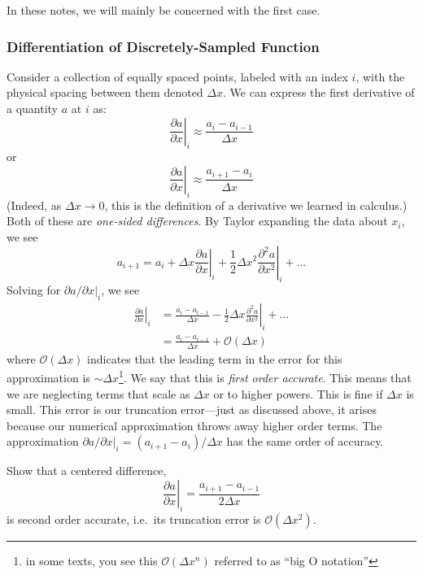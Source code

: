  In these notes, we will mainly be concerned with the first case.

\subsubsection{Differentiation of Discretely-Sampled Function}
\label{ch:intro:diff}
Consider a collection of equally spaced points, labeled with an index
$i$, with the physical spacing between them denoted $\Delta
x$.   We can express the first derivative of
a quantity $a$ at $i$ as:
\begin{equation}
\left . \frac{\partial a}{\partial x} \right |_i \approx \frac{a_i - a_{i-1}}{\Delta x}
\end{equation}
or
\begin{equation}
\left . \frac{\partial a}{\partial x} \right |_i \approx \frac{a_{i+1} - a_i}{\Delta x}
\end{equation}
%
(Indeed, as $\Delta x \rightarrow 0$, this is the definition of a
derivative we learned in calculus.)  Both of these are {\em one-sided
  differences}.  By Taylor expanding the data about $x_i$, we see
\begin{equation}
a_{i+1} = a_i + \Delta x \left . \frac{\partial a}{\partial x} \right |_i + \frac{1}{2} \Delta x^2 \left . \frac{\partial^2 a}{\partial x^2} \right |_i + \ldots
\end{equation}
Solving for ${\partial a}/{\partial x} |_i$, we see
\begin{align}
\left . \frac{\partial a}{\partial x} \right |_i &= 
    \frac{a_i - a_{i-1}}{\Delta x} - \frac{1}{2}\Delta x \left . \frac{\partial^2 a}{\partial x^2} \right |_i + \ldots \\ 
%
 &= \frac{a_i - a_{i-1}}{\Delta x} + \mathcal{O}(\Delta x)
\end{align}
where $\mathcal{O}(\Delta x)$ indicates that the leading term in the
error for this approximation is $\sim \Delta x$\footnote{in some
  texts, you see this $\mathcal{O}(\Delta x^n)$ referred to as ``big O
  notation''}.  We say that this is {\em first order accurate}.  This
means that we are neglecting terms that scale as $\Delta x$ or to
higher powers.  This is fine if $\Delta x$ is small.  This error is our
truncation error---just as discussed above, it arises because our
numerical approximation throws away higher order terms.  The
approximation ${\partial a}/{\partial x} |_i = ({a_{i+1} -
  a_i})/{\Delta x}$ has the same order of accuracy.

\begin{exercise}
{Show that a centered difference,
 \begin{equation*}
\left .\frac{\partial a}{\partial x} \right |_i = \frac{a_{i+1} - a_{i-1}}{2 \Delta x}
\end{equation*}
is second order
accurate, i.e.\ its truncation error is $\mathcal{O}(\Delta x^2)$.}
\end{exercise}

